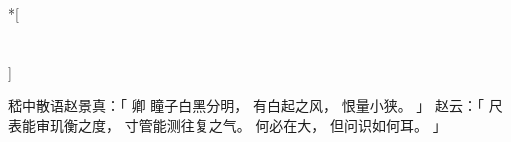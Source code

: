 
\switchcolumn[0]*[\section{}]

嵇中散语赵景真：「
    卿
    瞳子白黑分明，
    有白起之风，
    恨量小狭。
」
赵云：「
    尺表能审玑衡之度，
    寸管能测往复之气。
    何必在大，
    但问识如何耳。
」

\switchcolumn



